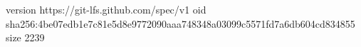 version https://git-lfs.github.com/spec/v1
oid sha256:4be07edb1e7c81e5d8e9772090aaa748348a03099c5571fd7a6db604cd834855
size 2239

